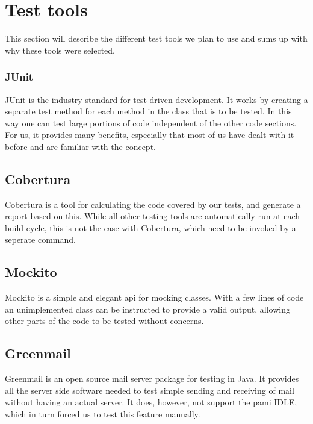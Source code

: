 \section{Test tools}
This section will describe the different test tools we plan to use and sums up with why these tools were selected.
\subsubsection{JUnit}
JUnit is the industry standard for test driven development. It works by creating a separate test method for each method in the class that is to be tested. In this way one can test large portions of code independent of the other code sections. For us, it provides many benefits, especially that most of us have dealt with it before and are familiar with the concept.

\subsection{Cobertura}
Cobertura is a tool for calculating the code covered by our tests, and generate a report based on this. While all other testing tools are automatically run at each build cycle, this is not the case with
Cobertura, which need to be invoked by a seperate command. 

\subsection{Mockito}
Mockito is a simple and elegant \gls{api} for mocking classes. With a few lines of code an unimplemented class can be instructed to provide a valid output, allowing other parts of the code to be tested without concerns.

\subsection{Greenmail}
Greenmail is an open source mail server package for testing in Java. It provides all the server side software needed to test simple sending and receiving of mail without having an actual server. 
It does, however, not support the \gls{pami} IDLE, which in turn forced us to test this feature manually.


